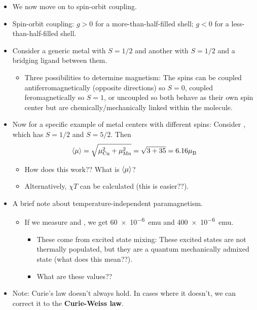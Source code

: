 \documentclass[../notes.tex]{subfiles}
\begin{document}
\begin{itemize}
\begin{itemize}
\begin{itemize}
        \end{itemize}
    \end{itemize}
    \pagebreak
    \item We now move on to spin-orbit coupling.
    \item Spin-orbit coupling: $g>0$ for a more-than-half-filled shell; $g<0$ for a less-than-half-filled shell.
    \item Consider a generic metal  with $S=1/2$ and another with $S=1/2$ and a bridging ligand  between them.
    \begin{itemize}
        \item Three possibilities to determine magnetism: The spins can be coupled antiferromagnetically (opposite directions) so $S=0$, coupled feromagnetically so $S=1$, or uncoupled so both behave as their own spin center but are chemically/mechanically linked within the molecule.
    \end{itemize}
    \item Now for a specific example of metal centers with different spins: Consider , which has $S=1/2$ and $S=5/2$. Then
    \begin{equation*}
        \prb{\mu} = \sqrt{\mu_{\ce{Cu}}^2+\mu_{\ce{Mn}}^2}
        = \sqrt{3+35}
        = 6.16\mB
    \end{equation*}
    \begin{itemize}
        \item How does this work?? What is $\left\langle{\mu}\right\rangle$?
        \item Alternatively, $\chi T$ can be calculated (this is easier??).
    \end{itemize}
    \item A brief note about temperature-independent paramagnetism.
    \begin{itemize}
        \item If we measure  and , we get \SI{60e-6}{emu} and \SI{400e-6}{emu}.
        \begin{itemize}
            \item These come from excited state mixing: These excited states are not thermally populated, but they are a quantum mechanically admixed state (what does this mean??).
            \item What are these values??
        \end{itemize}
    \end{itemize}
    \item Note: Curie's law doesn't always hold. In cases where it doesn't, we can correct it to the \textbf{Curie-Weiss law}.

\end{itemize}
\end{document}

